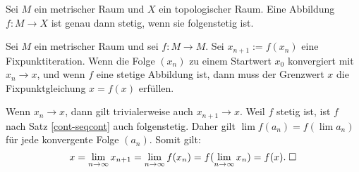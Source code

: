 \begin{Satz}\label{cont-seqcont}
Sei $M$ ein metrischer Raum und $X$ ein topologischer Raum.
Eine Abbildung $f\colon M\to X$ ist genau dann stetig, wenn
sie folgenstetig ist.
\end{Satz}

\begin{Satz}
Sei $M$ ein metrischer Raum und sei $f\colon M\to M$.
Sei $x_{n+1}:=f(x_n)$ eine Fixpunktiteration. Wenn die Folge
$(x_n)$ zu einem Startwert $x_0$ konvergiert mit $x_n\to x$, und
wenn $f$ eine stetige Abbildung ist, dann muss der Grenzwert $x$ die
Fixpunktgleichung $x=f(x)$ erfüllen.
\end{Satz}

\begin{Beweis}
Wenn $x_n\to x$, dann gilt trivialerweise auch $x_{n+1}\to x$.
Weil $f$ stetig ist, ist $f$ nach Satz \ref{cont-seqcont}
auch folgenstetig. Daher gilt $\lim f(a_n) = f(\lim a_n)$ für jede
konvergente Folge $(a_n)$. Somit gilt:
\[x=\lim_{n\to\infty} x_{n+1} = \lim_{n\to\infty} f(x_n)
= f(\lim_{n\to\infty} x_n) = f(x).\;\square\]
\end{Beweis}

